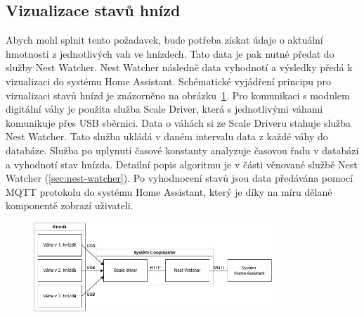\subsection{Vizualizace stavů hnízd}
Abych mohl splnit tento požadavek, bude potřeba získat údaje o aktuální hmotnosti z jednotlivých vah ve hnízdech.
Tato data je pak nutné předat do služby Nest Watcher.
Nest Watcher následně data vyhodnotí a výsledky předá k vizualizaci do systému Home Assistant.
Schématické vyjádření principu pro vizualizaci stavů hnízd je znázorněno na obrázku~\ref{fig:vizualizace_stavu_hnizd}. \newline
Pro komunikaci s modulem digitální váhy je použita služba Scale Driver, která s jednotlivými váhami komunikuje přes USB sběrnici.
Data o váhách si ze Scale Driveru stahuje služba Nest Watcher.
Tato služba ukládá v daném intervalu data z každé váhy do databáze.
Služba po uplynutí časové konstanty analyzuje časovou řadu v databázi a vyhodnotí stav hnízda.
Detailní popis algoritmu je v části věnované službě Nest Watcher (\ref{sec:nest-watcher}).
Po vyhodnocení stavů jsou data předávána pomocí MQTT protokolu do systému Home Assistant, který je díky na míru dělané komponentě zobrazí uživateli.
\begin{figure}[H]
    \centering
    \includegraphics[width=0.8\textwidth]{img/vizualizace_stavu_hnizd}
    \label{fig:vizualizace_stavu_hnizd}
\end{figure}

\clearpage

